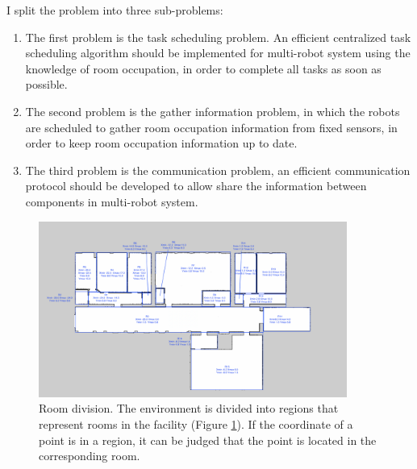 I split the problem into three sub-problems:
\begin{enumerate}
    \item The first problem is the task scheduling problem. An efficient centralized task scheduling algorithm should be implemented for multi-robot system using the knowledge of room occupation, in order to complete all tasks as soon as possible. 
    \item The second problem is the gather information problem, in which the robots are scheduled to gather room occupation information from fixed sensors, in order to keep room occupation information up to date.
    \item The third problem is the communication problem, an efficient communication protocol should be developed to allow share the information between components in multi-robot system.
\end{enumerate}


\begin{figure}[htbp]
	\centering
	\includegraphics[width = 0.9\textwidth]{content/images/ch3/room_division.png}
	\caption{Room division. The environment is divided into regions that represent rooms in the facility (Figure \ref{fig:room_division}). If the coordinate of a point is in a region, it can be judged that the point is located in the corresponding room.}
    \label{fig:room_division}
\end{figure}

